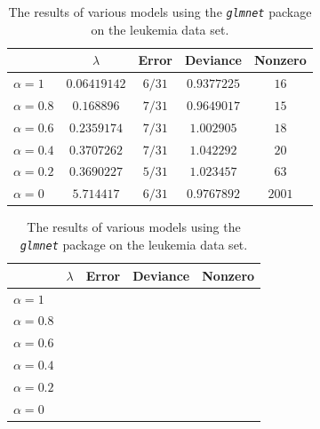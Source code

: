 \documentclass[10pt]{article}
\begin{document}
\begin{table}[ht]
    \centering
    \def\arraystretch{1.5}
    
    \begin{tabular}{lcccc} \toprule
         & $\lambda$ & Error & Deviance & Nonzero  \\ \midrule
        \rowcolor{SteelBlue3!10} $\alpha = 1$   & $0.06419142$ & $6/31$ & $0.9377225$ & $16$ \\ 
        $\alpha = 0.8$ & $0.168896$ & $7/31$   & $0.9649017$ & $15$ \\ 
        $\alpha = 0.6$ & $0.2359174$ & $7/31$  & $1.002905$  & $18$ \\ 
        $\alpha = 0.4$ & $0.3707262$ & $7/31$  & $1.042292$  & $20$ \\ 
        \rowcolor{SteelBlue3!10} $\alpha = 0.2$ & $0.3690227$ & $5/31$  & $1.023457$  & $63$ \\ 
        $\alpha = 0$   & $5.714417$ & $6/31$   & $0.9767892$ & $2001$ \\ \bottomrule
    \end{tabular}
    \caption{The results of various models using the \emph{\texttt{glmnet}} package on the colon data set.}
    \label{glmnetcolontab}
    
    \vspace{0.45cm}
    
    \begin{tabular}{lcccc} \toprule
         & $\lambda$ & Error & Deviance & Nonzero  \\ \midrule
        $\alpha = 1$   &  &  &  &  \\ 
        $\alpha = 0.8$ &  &  &  &  \\  
        $\alpha = 0.6$ &  &  &  &  \\ 
        $\alpha = 0.4$ &  &  &  &  \\ 
        $\alpha = 0.2$ &  &  &  &  \\ 
        $\alpha = 0$   &  &  &  &  \\  \bottomrule
    \end{tabular}
    \caption{The results of various models using the \emph{\texttt{glmnet}} package on the leukemia data set.}
    \label{glmnetleuktab}
\end{table}

\end{document}
